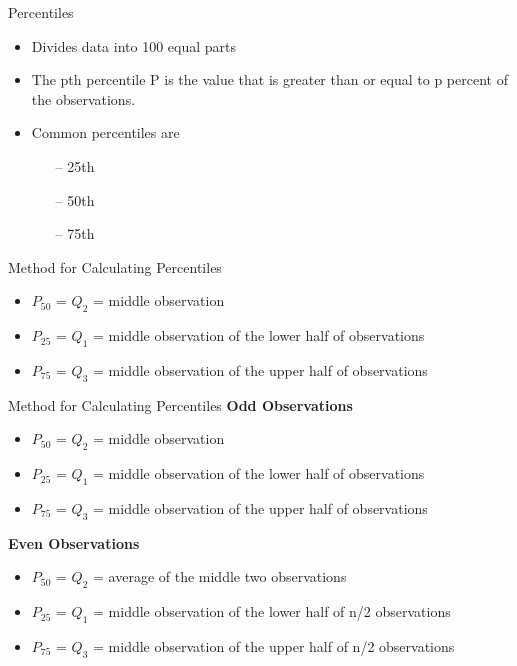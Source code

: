 \begin{frame}[t]{Percentiles}
	
	\begin{itemize}
		\item Divides data into 100 equal parts
		\item The pth percentile P is the value that is greater than or equal
		to p percent of the observations.
		\item Common percentiles are
		\begin{itemize}
			\item[--] 25th
			\item[--] 50th
			\item[--] 75th
		\end{itemize}
	\end{itemize}
\end{frame}


\begin{frame}[t]{Method for Calculating Percentiles}
	\begin{itemize}
		\item $P_{50}$ = $Q_2$ = middle observation
		\item $P_{25}$ = $Q_1$ = middle observation of the lower half of
		observations
		\item $P_{75}$ = $Q_3$ = middle observation of the upper half of
		observations
	\end{itemize}
\end{frame}


\begin{frame}[t]{Method for Calculating Percentiles}
	\textbf{Odd Observations}
	\begin{itemize}
		\item $P_{50}$ = $Q_2$ = middle observation
		\item $P_{25}$ = $Q_1$ = middle observation of the lower half of
		observations
		\item $P_{75}$ = $Q_3$ = middle observation of the upper half of
		observations
	\end{itemize}


	\textbf{Even Observations}
\begin{itemize}
	\item $P_{50}$ = $Q_2$ = average of the middle two observations
	\item $P_{25}$ = $Q_1$ = middle observation of the lower half of n/2
	observations
	\item $P_{75}$ = $Q_3$ = middle observation of the upper half of n/2
	observations
\end{itemize}
\end{frame}

